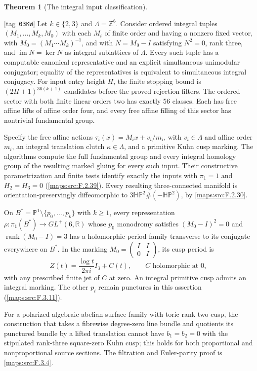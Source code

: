 \documentclass[11pt,a4paper]{article}
\numberwithin{equation}{section}
\theoremstyle{definition}
\newtheorem{maintheorem}{Theorem}
\newcommand{\StatementRecord}[4]{{\upshape\footnotesize[tag~\texttt{#3}]}\enspace\ignorespaces}
\begin{document}
\hypertarget{main-V-F}{}
\begin{maintheorem}[The integral input classification]
\hypertarget{tag-03KW}{}\label{series:V:F}
\StatementRecord{series:V:F}{proved}{03KW}{\cref{maps:src:F.2.39}, \cref{maps:src:F.3.11}, \cref{maps:src:F.3.4}}
Let $k\in\{2,3\}$ and $\Lambda=\mathbb Z^6$.
Consider ordered integral tuples $(M_1,\ldots,M_k,M_0)$ with each
$M_i$ of finite order and having a nonzero fixed vector, with
$M_0=(M_1\cdots M_k)^{-1}$, and with
$N=M_0-I$ satisfying $N^2=0$, rank three, and
$\operatorname{im}N=\ker N$ as integral sublattices of $\Lambda$.
Every such tuple has a computable canonical representative and an
explicit simultaneous unimodular conjugator; equality of the
representatives is equivalent to simultaneous integral conjugacy.
For input entry height $H$, the finite stopping bound is
$(2H+1)^{36(k+1)}$ candidates before the proved rejection filters.
The ordered sector with both finite linear orders two has exactly
56 classes.  Each has free affine lifts of affine order four,
and every free affine filling of this sector has nontrivial
fundamental group.

Specify the free affine actions
$\tau_i(x)=M_ix+v_i/m_i$, with $v_i\in\Lambda$ and affine order $m_i$, an integral translation clutch $\kappa\in\Lambda$,
and a primitive Kuhn cusp marking.  The algorithms compute the
full fundamental group and every integral homology group of the
resulting marked gluing for every such input.  Their constructive
parametrization and finite tests identify exactly the inputs with
$\pi_1=1$ and $H_2=H_3=0$ (\cref{maps:src:F.2.39}).
Every resulting three-connected manifold is orientation-preservingly
diffeomorphic to $3\mathbb{HP}^2\#(-\mathbb{HP}^2)$, by
\cref{maps:src:F.2.30}.

On $B^*=\mathbb P^1\setminus\{p_0,\ldots,p_k\}$ with $k\ge1$,
every representation $\rho:\pi_1(B^*)\to GL^+(6,\mathbb R)$
whose $p_0$ monodromy satisfies $(M_0-I)^2=0$ and
$\operatorname{rank}(M_0-I)=3$ has a holomorphic period family
transverse to its conjugate everywhere on $B^*$. In the marking
$M_0=\left(\begin{smallmatrix}I&I\\0&I\end{smallmatrix}\right)$,
its cusp period is
\[
 Z(t)=\frac{\log t}{2\pi i}I_3+C(t),\qquad C\text{ holomorphic at }0,
\]
with any prescribed finite jet of $C$ at zero. An integral primitive
cusp admits an integral marking. The other $p_i$ remain punctures
in this assertion (\cref{maps:src:F.3.11}).

For a polarized algebraic abelian-surface family with toric-rank-two
cusp, the construction that takes a fibrewise degree-zero line bundle
and quotients its punctured bundle by a lifted translation cannot
have $b_1=b_2=0$ with the stipulated rank-three square-zero Kuhn
cusp; this holds for both proportional and nonproportional source
sections. The filtration and Euler-parity proof is
\cref{maps:src:F.3.4}.

\end{maintheorem}
\end{document}
